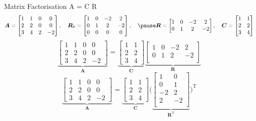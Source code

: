 \documentclass[mathserif, aspectratio=1610]{intbeamer}
\begin{document}
\begin{frame}{Matrix Factorisation A = C R}
$$
\bm{A} =
\begin{bmatrix}
1 & 1 & 0 & 0\\
2 & 2 & 0 & 0\\
3 & 4 & 2 & -2
\end{bmatrix},\quad
\bm{R}_0 =
\begin{bmatrix}
1 & 0 & -2 & 2\\
0 & 1 & 2 & -2\\
0 & 0 & 0 & 0
\end{bmatrix},\quad
\pause
\bm{R} =
\begin{bmatrix}
1 & 0 & -2 & 2\\
0 & 1 & 2 & -2\\
\end{bmatrix},\quad
\bm{C} =
\begin{bmatrix}
1 & 1\\
2 & 2\\
3 & 4
\end{bmatrix}
$$
\pause
$$
\underbrace{
\begin{bmatrix}
1 & 1 & 0 & 0\\
2 & 2 & 0 & 0\\
3 & 4 & 2 & -2
\end{bmatrix}
}_{\bm{A}}
=
\underbrace{
\begin{bmatrix}
1 & 1\\
2 & 2\\
3 & 4
\end{bmatrix}
}_{\bm{C}}
\underbrace{
\begin{bmatrix}
1 & 0 & -2 & 2\\
0 & 1 & 2 & -2\\
\end{bmatrix}
}_{\bm{R}}
$$
\pause
$$
\underbrace{
\begin{bmatrix}
1 & 1 & 0 & 0\\
2 & 2 & 0 & 0\\
3 & 4 & 2 & -2
\end{bmatrix}
}_{\bm{A}}
=
\underbrace{
\begin{bmatrix}
1 & 1\\
2 & 2\\
3 & 4
\end{bmatrix}
}_{\bm{C}}
\big(
\underbrace{
\begin{bmatrix}
1&0\\
0&1\\
-2&2\\
2&-2\\
\end{bmatrix}
}_{\bm{R}^\mathrm{T}}
\big)
^\mathrm{T}
$$
\end{frame}
\end{document}
